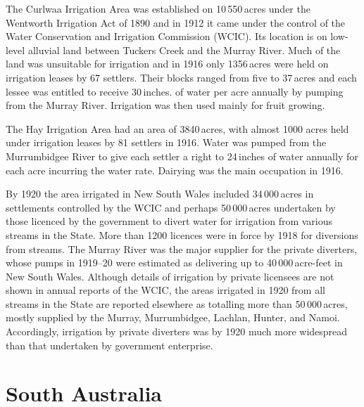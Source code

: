 The Curlwaa Irrigation Area  was
established on 10\,550\,acres under the Wentworth Irrigation Act
 of
1890 and in 1912 it came under the control of the Water Conservation
and Irrigation Commission (WCIC).  Its location is on low-level alluvial land
between Tuckers Creek \index{creek!Tuckers} and the Murray River. Much
of the land was unsuitable for irrigation and in 1916 only 1356\,acres
were held on irrigation leases by 67 settlers.  Their blocks ranged
from five to 37\,acres and each lessee was entitled to receive
30\,inches. of water per acre annually by pumping from the Murray
River.  Irrigation was then used mainly for fruit
growing.

The Hay Irrigation Area  had an area of
3840\,acres, with almost 1000 acres held under irrigation leases by 81
settlers in 1916. Water was pumped from the Murrumbidgee River to give
each settler a right to 24\,inches of water annually for each acre
incurring the water rate.  Dairying was the main occupation in
1916.

By 1920 the area irrigated in New South Wales included 34\,000\,acres
in settlements controlled by the WCIC and perhaps 50\,000\,acres
undertaken by those licenced by the government to divert water for
irrigation from various streams in the State.  More than 1200 licences
were in force by 1918 for diversions from streams.  The Murray River
was the major supplier for the private diverters, whose pumps in
1919--20 were estimated as delivering up to 40\,000\,acre-feet in New
South Wales.  Although details of irrigation by private licensees are
not shown in annual reports of the WCIC, the areas irrigated in 1920
from all streams in the State are reported elsewhere as totalling more
than 50\,000\,acres, mostly supplied by the Murray, Murrumbidgee,
Lachlan, Hunter, and Namoi.  Accordingly, irrigation by private
diverters was by 1920 much more widespread than that undertaken by
government enterprise.

\section*{South Australia}

